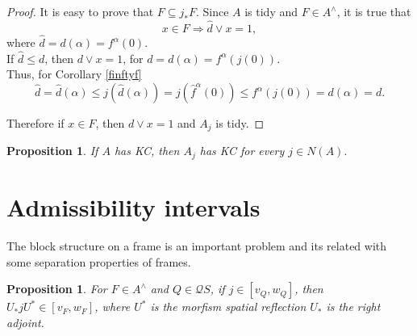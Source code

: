 \documentclass[11pt]{amsart}
\theoremstyle{plain}
\newtheorem{prop}[thm]{Proposition}
\theoremstyle{definition}
\begin{document}
\begin{proof}
It is easy to prove that $F\subseteq j_*F$. Since $A$ is tidy and $F\in A^\wedge$, it is true that 
\[
x\in F\Rightarrow \hat{d}\vee x=1,
\]
where $\hat{d}=d(\alpha)=f^\alpha(0)$.\\
If $\hat{d}\leq d$, then $d\vee x=1$, for $d=d(\alpha)=f^\alpha(j(0))$.\\

Thus, for Corollary \ref{finftyf}
\[
\hat{d}=\hat{d}(\alpha)\leq j(\hat{d}(\alpha))=j(\hat{f}^\alpha(0))\leq f^\alpha(j(0))=d(\alpha)=d.
\]

Therefore if $x\in F$, then $d\vee x=1$ and $A_j$ is tidy.
\end{proof}



\begin{prop}\label{KCquout}
    If $A$ has KC, then $A_j$ has KC for every $j\in N(A).$
\end{prop}

\section{Admissibility intervals}

The block structure on a frame is an important problem and its related with some separation properties of frames.

\begin{prop}\label{morfismo}
For $F\in A^\wedge$ and $Q\in\mathcal{Q}S$, if $j\in [v_Q, w_Q]$, then $U_*jU^*\in [v_F, w_F]$, where $U^*$ is the morfism spatial reflection $U_*$ is the right adjoint.
\end{prop}
\end{document}
